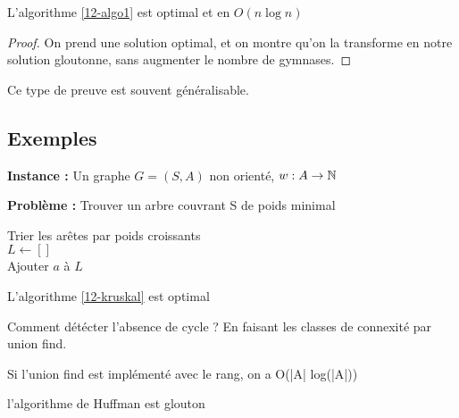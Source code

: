 \begin{proposition}
	L'algorithme \ref{12-algo1} est optimal et en $O(n \log n)$
\end{proposition}

\begin{proof}
	On prend une solution optimal, et on montre qu'on la transforme en notre solution gloutonne, sans augmenter le nombre de gymnases.
\end{proof}

\begin{rem}
	Ce type de preuve est souvent généralisable.
\end{rem}

\subsection{Exemples}

\begin{definition} \enspace
	
	\textbf{Instance :} Un graphe $G = (S, A)$ non orienté, $w : A \to \mathbb{N}$
	
	\textbf{Problème :} Trouver un arbre couvrant S de poids minimal
\end{definition}

\begin{algorithm}
	\label{12-kruskal}
	\caption{$Kruskal(G)$}
	Trier les arêtes par poids croissants\\
	$L \gets []$\\
	{
			{Ajouter $a$ à $L$}
	}
\end{algorithm}

\begin{proposition}
	L'algorithme \ref{12-kruskal} est optimal
\end{proposition}

\begin{rem}
	Comment détécter l'absence de cycle ? En faisant les classes de connexité par union find.
\end{rem}

\begin{proposition}
	Si l'union find est implémenté avec le rang, on a O(|A| log(|A|))
\end{proposition}

\begin{rem}
	l'algorithme de Huffman est glouton
\end{rem}

